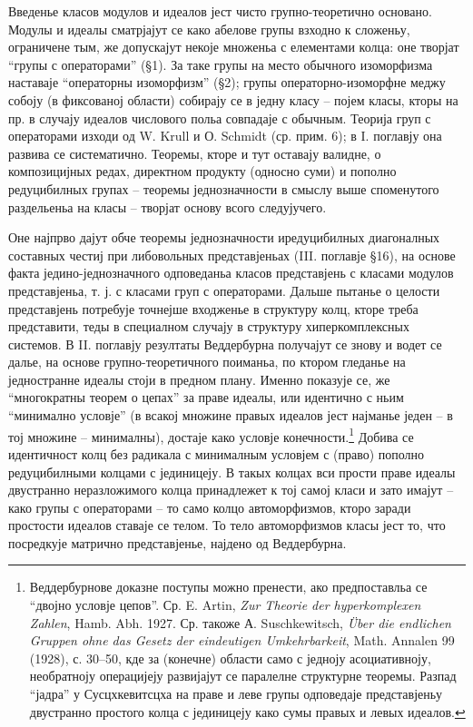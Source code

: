 ﻿\documentclass[11pt]{article}
\begin{document}
Введенье класов модулов и идеалов јест чисто групно-теоретично основано. Модулы и идеалы сматрјајут се како абелове групы взходно к сложеньу, ограничене тым, же допускајут некоје множеньа с елементами колца: оне творјат “групы с операторами” (§1). За таке групы на место обычного изоморфизма наставаје “операторны изоморфизм” (§2); групы операторно-изоморфне меджу собоју (в фиксованој области) собирају се в једну класу -- појем класы, кторы на пр. в случају идеалов числового польа совпадаје с обычным. Теорија груп с операторами изходи од W. Krull и О. Schmidt (ср. прим. 6); в I. поглавју она развива се систематично. Теоремы, кторе и тут оставају валидне, о композицијных редах, директном продукту (односно суми) и пополно редуцибилных групах -- теоремы једнозначности в смыслу выше споменутого раздельеньа на класы -- творјат основу всого следујучего.

Оне најпрво дајут обче теоремы једнозначности иредуцибилных диагоналных составных честиј при либовольных представјеньах (III. поглавје §16), на основе факта једино-једнозначного одповеданьа класов представјень с класами модулов представјеньа, т. ј. с класами груп с операторами. Дальше пытанье о целости представјень потребује точнејше входженье в структуру колц, кторе треба представити, теды в специалном случају в структуру хиперкомплексных системов. В II. поглавју резултаты Веддербурна получајут се знову и водет се далье, на основе групно-теоретичного поиманьа, по ктором гледанье на једностранне идеалы стоји в предном плану. Именно показује се, же “многократны теорем о цепах” за праве идеалы, или идентично с ньим “минимално условје” (в всакој множине правых идеалов јест најманье једен -- в тој множине -- минималны), достаје како условје конечности.\footnote{Веддербурнове доказне поступы можно пренести, ако предпоставльа се “двојно условје цепов”. Ср. E. Artin, \emph{Zur Theorie der hyperkomplexen Zahlen}, Hamb. Abh. 1927. Ср. такоже А. Suschkewitsch, \emph{Über die endlichen Gruppen ohne das Gesetz der eindeutigen Umkehrbarkeit}, Math. Annalen 99 (1928), с. 30--50, кде за (конечне) области само с једноју асоциативноју, необратноју операцијеју развијајут се паралелне структурне теоремы. Разпад “јадра” у Сусцхкевитсцха на праве и леве групы одповедаје представјеньу двустранно простого колца с јединицеју како сумы правых и левых идеалов.} Добива се идентичност колц без радикала с минималным условјем с (право) пополно редуцибилными колцами с јединицеју. В такых колцах вси прости праве идеалы двустранно неразложимого колца принадлежет к тој самој класи и зато имајут -- како групы с операторами -- то само колцо автоморфизмов, кторо заради простости идеалов ставаје се телом. То тело автоморфизмов класы јест то, что посредкује матрично представјенье, најдено од Веддербурна.
\end{document}
